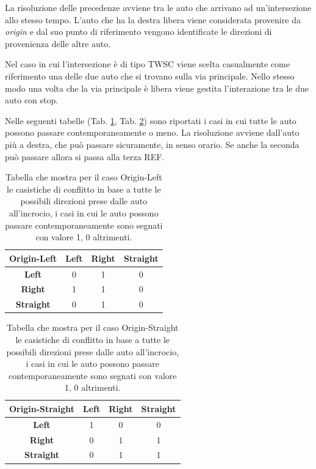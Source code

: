 La risoluzione delle precedenze avviene tra le auto che arrivano ad un'intersezione allo stesso tempo. 
L'auto che ha la destra libera viene considerata provenire da \textit{origin} e dal suo punto di riferimento
vengono identificate le direzioni di provenienza delle altre auto. 

Nel caso in cui l'intersezione è di tipo TWSC viene scelta casualmente come riferimento una delle due auto che si trovano 
sulla via principale. Nello stesso modo una volta che la via principale è libera viene gestita l'interazione tra le due auto con stop.

Nelle seguenti tabelle (Tab. \ref{tab:Origin-Left}, Tab. \ref{Origin-Straight}) sono riportati i casi in cui tutte le auto possono passare contemporaneamente o meno.
La risoluzione avviene dall'auto più a destra, che può passare sicuramente, in senso orario. 
Se anche la seconda può passare allora si passa alla terza REF.

\begin{table}[ht]
    \centering
    \begin{tabular}{|c|c|c|c|}
        \hline
        \textbf{Origin-Left} & \textbf{Left} & \textbf{Right} & \textbf{Straight} \\ \hline
        \textbf{Left}        & 0             & 1              & 0                 \\ \hline
        \textbf{Right}       & 1             & 1              & 0                 \\ \hline
        \textbf{Straight}    & 0             & 1              & 0                 \\ \hline
    \end{tabular}
    \caption{Tabella che mostra per il caso Origin-Left le casistiche di conflitto in base a tutte le possibili direzioni prese dalle auto all'incrocio, i casi in cui le auto possono passare contemporaneamente sono segnati con valore 1, 0 altrimenti.
    }
    \label{tab:Origin-Left}
\end{table}


\begin{table}[ht]
    \centering
    \begin{tabular}{|c|c|c|c|}
        \hline
        \textbf{Origin-Straight} & \textbf{Left} & \textbf{Right} & \textbf{Straight} \\ \hline
        \textbf{Left}            & 1             & 0              & 0                 \\ \hline
        \textbf{Right}           & 0             & 1              & 1                 \\ \hline
        \textbf{Straight}        & 0             & 1              & 1                 \\ \hline
    \end{tabular}
    \caption{Tabella che mostra per il caso Origin-Straight le casistiche di conflitto in base a tutte le possibili direzioni prese dalle auto all'incrocio, i casi in cui le auto possono passare contemporaneamente sono segnati con valore 1, 0 altrimenti.}
    \label{Origin-Straight}
\end{table}



